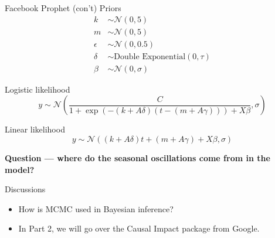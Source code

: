 \documentclass[20pt]{beamer}
\begin{document}
\begin{frame}{Facebook Prophet (con't)}
Priors
\begin{align*}
k & \sim \mathcal{N}(0, 5) \\
m & \sim \mathcal{N}(0, 5) \\
\epsilon & \sim \mathcal{N}(0, 0.5) \\
\delta & \sim \text{Double Exponential}(0, \tau) \\
\beta & \sim \mathcal{N}(0, \sigma)
\end{align*}

Logistic likelihood
\begin{equation*}
y \sim \mathcal{N}\left( \frac{C}
  {1 + \exp(-(k + A \delta) (t - (m + A \gamma))) + X \beta}, \sigma \right)
\end{equation*}

Linear likelihood
\begin{equation*}
y \sim \mathcal{N}((k + A \delta) t + (m + A \gamma) + X \beta, \sigma)
\end{equation*}

\textbf{Question --- where do the seasonal oscillations come from in the model?}
\end{frame}




\begin{frame}{Discussions}
\begin{itemize}
\item How is MCMC used in Bayesian inference?

\item In Part 2, we will go over the Causal Impact package from Google.
\end{itemize}
\end{frame}
\end{document}
